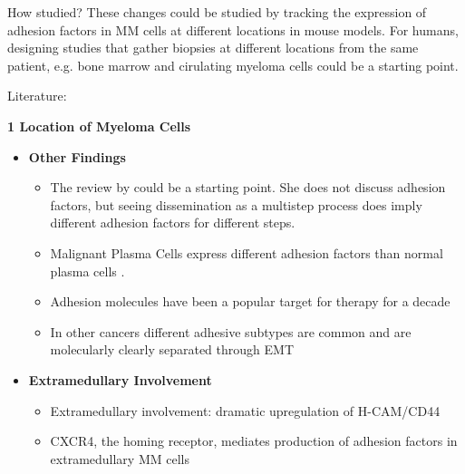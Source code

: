 How studied?
These changes could be studied by tracking the
expression of adhesion factors in MM cells at different locations in mouse
models. For humans, designing studies that gather biopsies at different
locations from the same patient, e.g. bone marrow and cirulating myeloma cells
could be a starting point.


Literature:

\textbf{1 Location of Myeloma Cells}
\begin{itemize}
      \item \textbf{Other Findings}
            \begin{itemize}
                  \item The review by
                        \citet{zeissigTumourDisseminationMultiple2020} could be
                        a starting point. She does not discuss adhesion factors,
                        but seeing dissemination as a multistep process does
                        imply different adhesion factors for different steps.
                  \item Malignant Plasma Cells express different adhesion
                        factors than normal plasma cells
                        \cite{cookRoleAdhesionMolecules1997,
                              bouzerdanAdhesionMoleculesMultiple2022}.

                  \item Adhesion molecules have been a popular target for
                        therapy for a decade \cite{nairChapterSixEmerging2012}
                  \item In other cancers different adhesive subtypes are common
                        and are molecularly clearly separated through \ac{EMT}
                        \cite{gengDynamicSwitchTwo2014}
            \end{itemize}

      \item \textbf{Extramedullary Involvement}
            \begin{itemize}
                  \item Extramedullary involvement:  dramatic upregulation of H-CAM/CD44 \cite{}
                  \item CXCR4, the homing receptor, mediates production of
                        adhesion factors in extramedullary MM cells
                        \cite{roccaroCXCR4RegulatesExtraMedullary2015}
            \end{itemize}


\end{itemize}
